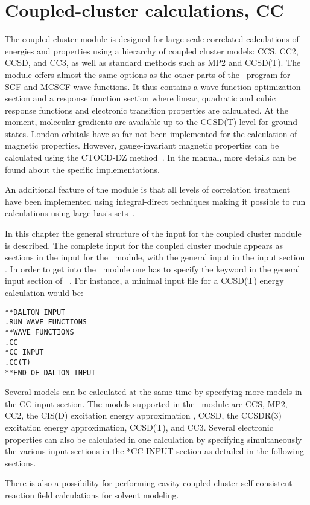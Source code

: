 \chapter{Coupled-cluster calculations, CC}\label{ch:CC}

The coupled cluster module {\cc} is designed for large-scale
correlated calculations of energies and properties using a
hierarchy of coupled cluster models: CCS, CC2, CCSD, and CC3, as well as standard methods such as MP2 and CCSD(T).
The module offers almost the same options as the other
parts of the \dalton\ program for SCF and MCSCF wave functions.
It thus contains a wave function optimization section and 
a response function section
where linear, quadratic and cubic response functions and electronic
transition properties are calculated.
At the moment, molecular gradients are available 
up to the CCSD(T) level for ground states.  
London orbitals have so far not been implemented 
for the calculation of magnetic
properties.
However, gauge-invariant magnetic properties can be calculated using the
CTOCD-DZ method~\cite{ctocd,pccpcctocd}.
In the manual, more details can be found about the specific implementations.

An additional feature of the module is that all levels of correlation
treatment have been implemented using integral-direct techniques making
it possible to run calculations using large basis
sets~\cite{directCC}.

In this chapter the general structure of the input for the
coupled cluster module is described.
The complete input for the coupled cluster module appears as
sections in the input for the \sir\ module, with the general
input in the input section . In order to get into the \cc\ module
one has to specify the  keyword in the general input
section of \sir\ . For instance, a minimal
input file for a CCSD(T) energy calculation would be:
\begin{verbatim}
**DALTON INPUT
.RUN WAVE FUNCTIONS
**WAVE FUNCTIONS
.CC
*CC INPUT
.CC(T)
**END OF DALTON INPUT
\end{verbatim}

Several models can be calculated at the same time by specifying more models
in the CC input section. 
The models supported in the \cc\ module are 
CCS\cite{Christiansen:CPL243},
MP2\cite{Moller34},
CC2\cite{Christiansen:CPL243},
the CIS(D) excitation energy approximation \cite{Head-Gordon:94},
CCSD\cite{Purvis82},
the CCSDR(3) excitation energy approximation\cite{Christiansen:PERTURBATIVE_TRIPLES}, 
CCSD(T)\cite{Raghavachari89}, and CC3\cite{Christiansen:JCP103,Koch:JCP106}.
Several electronic properties can also 
be calculated in one calculation by specifying simultaneously 
the various input sections in the *CC INPUT section
as detailed in the following sections.

There is also a possibility for performing cavity coupled cluster
self-consistent-reaction field calculations for solvent modeling.
